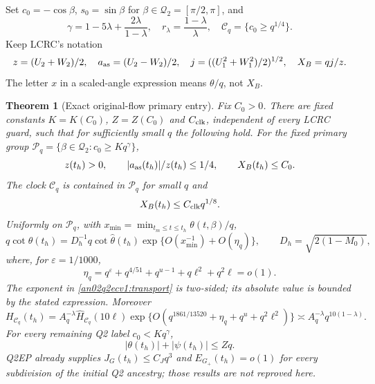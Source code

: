 \documentclass[11pt]{article}
\newtheorem{theorem}{Theorem}[section]
\theoremstyle{remark}\newtheorem{remark}[theorem]{Remark}
\newcommand{\eps}{\varepsilon}
\newcommand{\Cl}{\mathcal C_q}
\newcommand{\Qtwo}{\mathcal Q_2}
\begin{document}
Set $c_0=-\cos\beta$, $s_0=\sin\beta$ for $\beta\in\Qtwo=[\pi/2,\pi]$,
and
\[
 \gamma=1-5\lambda+\frac{2\lambda}{1-\lambda},\quad
 r_\lambda=\frac{1-\lambda}{\lambda},\quad
 \Cl=\{c_0\ge q^{1/4}\}.
\]
Keep LCRC's notation
\[
 z=(U_2+W_2)/2,\quad a_{\rm as}=(U_2-W_2)/2,\quad
 j=((U_1^2+W_1^2)/2)^{1/2},\quad X_B=qj/z.
\]
The letter $x$ in a scaled-angle expression means $\theta/q$,
not $X_B$.

\begin{theorem}[Exact original-flow primary entry]
\label{an02q2ecv1:main}
Fix $C_0>0$. There are fixed constants $K=K(C_0)$,
$Z=Z(C_0)$ and $C_{\rm clk}$, independent of every LCRC guard,
such that for sufficiently small $q$ the following hold.
For the fixed primary group
$\mathcal P_q=\{\beta\in\Qtwo:c_0\ge Kq^\gamma\}$,
\begin{equation}
 z(t_h)>0,\qquad |a_{\rm as}(t_h)|/z(t_h)\le1/4,\qquad
 X_B(t_h)\le C_0 .
 \label{an02q2ecv1:primary}
\end{equation}
The clock $\Cl$ is contained in $\mathcal P_q$ for small $q$ and
\begin{equation}
 X_B(t_h)\le C_{\rm clk}q^{1/8}.
 \label{an02q2ecv1:clockratio}
\end{equation}
Uniformly on $\mathcal P_q$, with
$x_{\min}=\min_{t_m\le t\le t_h}\theta(t,\beta)/q$,
\begin{equation}
 q\cot\theta(t_h)=D_h^{-1}q\cot\widehat\theta(t_h)
       \exp\{O(x_{\min}^{-1})+O(\eta_q)\},\qquad
 D_h=\sqrt{2(1-M_0)},
 \label{an02q2ecv1:transport}
\end{equation}
where, for $\eps=1/1000$,
\[
 \eta_q=q^\eps+q^{4/51}+q^{u-1}+q\ell^2+q^2\ell=o(1).
\]
The exponent in \eqref{an02q2ecv1:transport} is two-sided;
its absolute value is bounded by the stated expression.
Moreover
\begin{equation}
 H_{\Cl}(t_h)=A_q^{-\lambda}\widehat H_{\Cl}(10\ell)
       \exp\{O(q^{1861/13520}+\eta_q+q^u+q^2\ell^2)\}
 \asymp A_q^{-\lambda}q^{10(1-\lambda)}.
 \label{an02q2ecv1:seed}
\end{equation}
For every remaining Q2 label $c_0<Kq^\gamma$,
\begin{equation}
 |\theta(t_h)|+|\psi(t_h)|\le Zq .
 \label{an02q2ecv1:chartentry}
\end{equation}
Q2EP already supplies $J_G(t_h)\le C_Jq^3$ and
$E_{G_+}(t_h)=o(1)$ for every subdivision of the initial Q2 ancestry;
those results are not reproved here.
\end{theorem}
\end{document}
